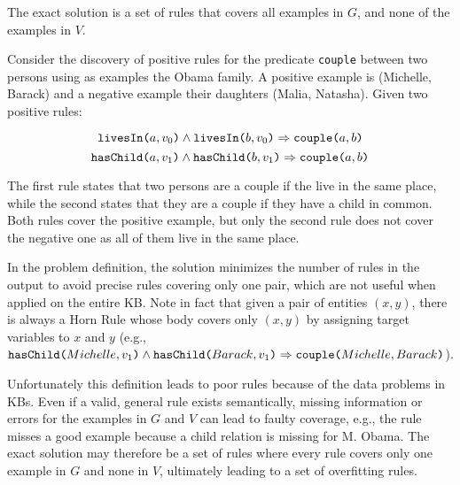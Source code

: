 The exact solution is a set of rules that covers all examples in $G$, and none of the examples in $V$. 

\begin{example}
	Consider the discovery of positive rules for the predicate {\tt couple} between two persons using as examples the Obama family. A positive example is (Michelle, Barack) and a negative example their daughters (Malia, Natasha). 
	Given two positive rules:
	
\vspace{-2mm}	
	{\small	
\begin{equation*}
		 \texttt{livesIn(}a,v_0\texttt{)} \wedge \texttt{livesIn(}b,v_0\texttt{)} \Rightarrow  \texttt{couple(}a,b\texttt{)}  
	\end{equation*}
\begin{equation*}
		 \texttt{hasChild(}a,v_1\texttt{)} \wedge \texttt{hasChild(}b,v_1\texttt{)} \Rightarrow  \texttt{couple(}a,b\texttt{)}  
	\end{equation*}
}
\vspace{-3mm}	

\noindent
The first rule states that two persons are a couple if the live in the same place, while the second states that they are a couple if they have a child in common. Both rules cover the positive example, but only the second rule does not cover the negative one as all of them live in the same place. 
\end{example} 

\vspace{1ex}	
In the problem definition, the solution minimizes the number of rules in the output to avoid precise rules covering only one pair, which are not useful when applied on the entire KB. Note in fact that given a pair of entities $(x,y)$, there is always a Horn Rule whose body covers only $(x,y)$ by assigning target variables to $x$ and $y$ (e.g., {\small $\texttt{hasChild(}Michelle,v_1\texttt{)} \wedge \texttt{hasChild(}Barack,v_1\texttt{)} \Rightarrow  \texttt{couple(}Michelle,Barack\texttt{)}$}).


Unfortunately
this definition leads to poor rules because of the data problems in KBs. Even if a valid, general rule exists semantically, missing information or errors for the examples in $G$ and $V$ can lead to faulty coverage, e.g., the rule misses a good example because a child relation is missing for M. Obama. %
The exact solution may therefore be a set of rules where every rule covers only one example in $G$ and none in $V$, ultimately leading to a set of overfitting rules.

